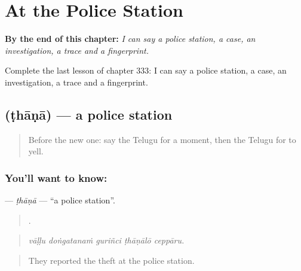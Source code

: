 
\chapter{At the Police Station}
\label{ch:te-at-the-police-station}

\begin{chapteropening}
\textbf{By the end of this chapter:} \emph{I can say a police station, a case, an investigation, a trace and a fingerprint.}

Complete the last lesson of chapter 333: I can say a police station, a case, an investigation, a trace and a fingerprint.
\end{chapteropening}

\section[\texorpdfstring{\te{ఠాణా} (ṭhāṇā)}{ఠాణా (ṭhāṇā)}]{ (ṭhāṇā) — a police station}

\label{lesson:TE-C333-thana}



\begin{quote}
Before the new one: say the Telugu for a moment, then the Telugu for to yell.
\end{quote}

\subsection*{You'll want to know: }
\textbf{} — \emph{ṭhāṇā} — \textquotedblleft{}a police station\textquotedblright{}.

\begin{quote}
    .
\end{quote}

\begin{quote}
\emph{vāḷḷu doṅgatanaṁ guriñci ṭhāṇālō ceppāru.}
\end{quote}

\begin{quote}
They reported the theft at the police station.
\end{quote}

